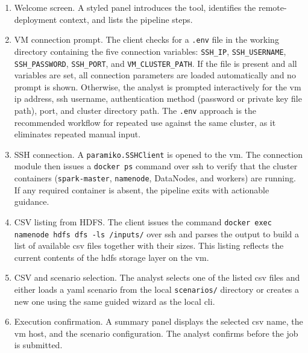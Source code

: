 \begin{enumerate}

\item Welcome screen. A styled panel introduces the tool, identifies the
      remote-de\-ploy\-ment context, and lists the pipeline steps.

\item VM connection prompt. The client checks for a \texttt{.env} file in the
      working directory containing the five connection variables: \texttt{SSH\_IP},
      \texttt{SSH\_USERNAME}, \texttt{SSH\_PASSWORD}, \texttt{SSH\_PORT}, and
      \texttt{VM\_CLUSTER\_PATH}.  If the file is present and all variables are
      set, all connection parameters are loaded automatically and no prompt is shown.
      Otherwise, the analyst is prompted interactively for the \gls{vm} \gls{ip} address,
      \gls{ssh} username, authentication method (password or private key file path), port,
      and cluster directory path.  The \texttt{.env} approach is the recommended workflow
      for repeated use against the same cluster, as it eliminates repeated manual input.

\item SSH connection. A \texttt{paramiko.SSHClient} is opened to the \gls{vm}.  The
      connection module then issues a \texttt{docker ps} command over \gls{ssh} to verify that
      the cluster containers (\texttt{spark-master}, \texttt{namenode}, DataNodes, and workers)
      are running.  If any required container is absent, the pipeline exits with actionable
      guidance.

\item CSV listing from HDFS. The client issues the command
      \texttt{docker exec namenode hdfs dfs -ls /inputs/} over \gls{ssh} and parses the output
      to build a list of available \gls{csv} files together with their sizes.  This listing
      reflects the current contents of the \gls{hdfs} storage layer on the \gls{vm}.

\item CSV and scenario selection. The analyst selects one of the listed \gls{csv} files
      and either loads a \gls{yaml} scenario from the local \texttt{scenarios/} directory or
      creates a new one using the same guided wizard as the local \gls{cli}.

\item Execution confirmation. A summary panel displays the selected \gls{csv} name,
      the \gls{vm} host, and the scenario configuration.  The analyst confirms before the job
      is submitted.


\end{enumerate}
